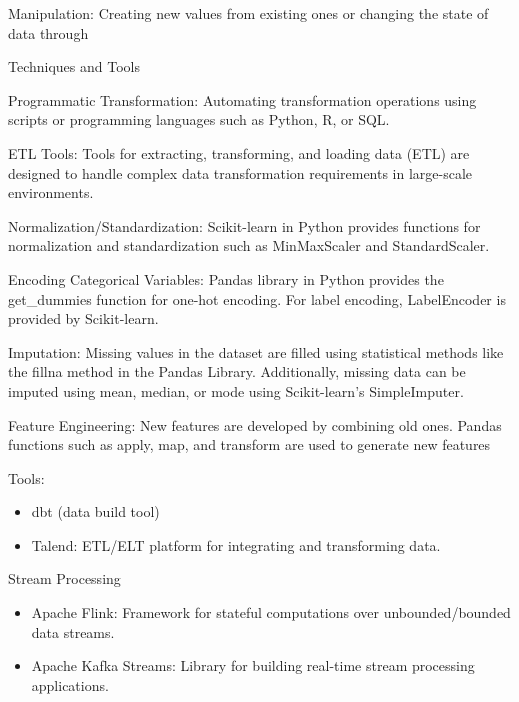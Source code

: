 \documentclass[12pt]{book}
\begin{document}
Manipulation: Creating new values from existing ones or changing the state of data through

Techniques and Tools

Programmatic Transformation: Automating transformation operations using scripts or programming languages such as Python, R, or SQL.

ETL Tools: Tools for extracting, transforming, and loading data (ETL) are designed to handle complex data transformation requirements in large-scale environments.

Normalization/Standardization: Scikit-learn in Python provides functions for normalization and standardization such as MinMaxScaler and StandardScaler.

Encoding Categorical Variables: Pandas library in Python provides the get_dummies function for one-hot encoding. For label encoding, LabelEncoder is provided by Scikit-learn.

Imputation: Missing values in the dataset are filled using statistical methods like the fillna method in the Pandas Library. Additionally, missing data can be imputed using mean, median, or mode using Scikit-learn’s SimpleImputer.

Feature Engineering: New features are developed by combining old ones. Pandas functions such as apply, map, and transform are used to generate new features

Tools:
\begin{itemize}
    \item dbt (data build tool)
    \item Talend: ETL/ELT platform for integrating and transforming data.
\end{itemize}

Stream Processing
\begin{itemize}
    \item Apache Flink: Framework for stateful computations over unbounded/bounded data streams.
    \item Apache Kafka Streams: Library for building real-time stream processing applications.
\end{itemize}
\end{document}
